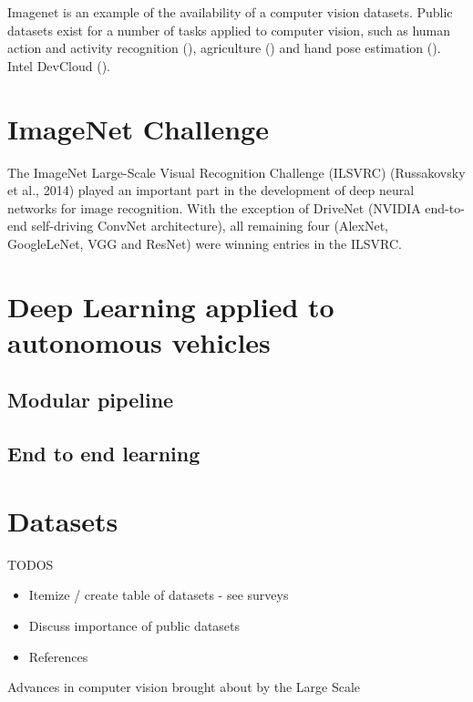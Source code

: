 Imagenet is an example of the availability of a computer vision datasets. Public datasets exist for a number of tasks applied to computer vision, such as  
human action and activity recognition (\cite{chaquet2013survey}), agriculture (\cite{lu2020survey}) and hand pose estimation (\cite{li2019survey}).
Intel DevCloud (\cite{IntelDevCloud2020}).



\section{ImageNet Challenge}

The  ImageNet Large-Scale Visual Recognition Challenge (ILSVRC) (Russakovsky et al., 2014) played an important part in the development of deep neural networks for image recognition. With the exception of DriveNet (NVIDIA end-to-end self-driving ConvNet architecture), all remaining four (AlexNet, GoogleLeNet, VGG and ResNet) were winning entries in the ILSVRC.  



\section{Deep Learning applied to autonomous vehicles}

\subsection{Modular pipeline}

\subsection{End to end learning}



\lipsum[1]

\section{Datasets}

TODOS

\begin{itemize}
    \item Itemize / create table of datasets - see surveys
    \item Discuss importance of public datasets
    \item References
\end{itemize}

Advances in computer vision brought about by the Large Scale 

\lipsum[2]
